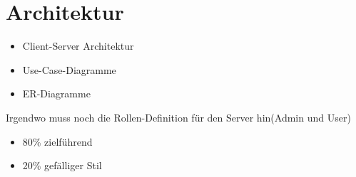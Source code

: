 \chapter{Architektur}
\label{cha:architektur}

\begin{itemize}
\item Client-Server Architektur
\item Use-Case-Diagramme
\item ER-Diagramme
\end{itemize}

Irgendwo muss noch die Rollen-Definition für den Server hin(Admin und User)

\begin{itemize}
\item 80\% zielführend
\item 20\% gefälliger Stil
\end{itemize}
